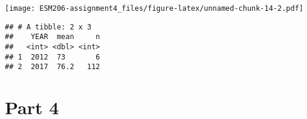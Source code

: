 \documentclass[]{article}
\newenvironment{Shaded}{\begin{snugshade}}{\end{snugshade}}
\newcommand{\KeywordTok}[1]{\textcolor[rgb]{0.13,0.29,0.53}{\textbf{#1}}}
\newcommand{\DataTypeTok}[1]{\textcolor[rgb]{0.13,0.29,0.53}{#1}}
\newcommand{\StringTok}[1]{\textcolor[rgb]{0.31,0.60,0.02}{#1}}
\newcommand{\OperatorTok}[1]{\textcolor[rgb]{0.81,0.36,0.00}{\textbf{#1}}}
\newcommand{\NormalTok}[1]{#1}
\begin{document}
\texttt{[image: ESM206-assignment4\_files/figure-latex/unnamed-chunk-14-2.pdf]}

\begin{Shaded}
\end{Shaded}

\begin{verbatim}
## # A tibble: 2 x 3
##    YEAR  mean     n
##   <int> <dbl> <int>
## 1  2012  73       6
## 2  2017  76.2   112
\end{verbatim}

\section{Part 4}\label{part-4}
\end{document}
